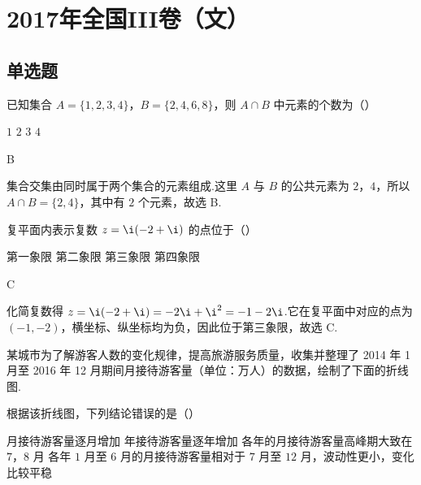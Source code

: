 \chapter{2017年全国III卷（文）}

\section{单选题}

\begin{problem}
已知集合 \(A=\{1,2,3,4\}\)，\(B=\{2,4,6,8\}\)，则 \(A\cap B\) 中元素的个数为（\quad）

\choices
    {\(1\)}
    {\(2\)}
    {\(3\)}
    {\(4\)}
\end{problem}

\begin{answer}
B
\end{answer}

\begin{solution}
集合交集由同时属于两个集合的元素组成.这里 \(A\) 与 \(B\) 的公共元素为 \(2\)，\(4\)，所以 \(A\cap B=\{2,4\}\)，其中有 \(2\) 个元素，故选 B.
\end{solution}

\begin{problem}
复平面内表示复数 \(z=\i(-2+\i)\) 的点位于（\quad）

\choices
    {第一象限}
    {第二象限}
    {第三象限}
    {第四象限}
\end{problem}

\begin{answer}
C
\end{answer}

\begin{solution}
化简复数得 \(z=\i(-2+\i)=-2\i+\i^2=-1-2\i\).它在复平面中对应的点为 \((-1,-2)\)，横坐标、纵坐标均为负，因此位于第三象限，故选 C.
\end{solution}

\begin{problem}
某城市为了解游客人数的变化规律，提高旅游服务质量，收集并整理了 2014 年 1 月至 2016 年 12 月期间月接待游客量（单位：万人）的数据，绘制了下面的折线图.


根据该折线图，下列结论错误的是（\quad）

\choices
    {月接待游客量逐月增加}
    {年接待游客量逐年增加}
    {各年的月接待游客量高峰期大致在 \(7\)，\(8\) 月}
    {各年 \(1\) 月至 \(6\) 月的月接待游客量相对于 \(7\) 月至 \(12\) 月，波动性更小，变化比较平稳}
\end{problem}

